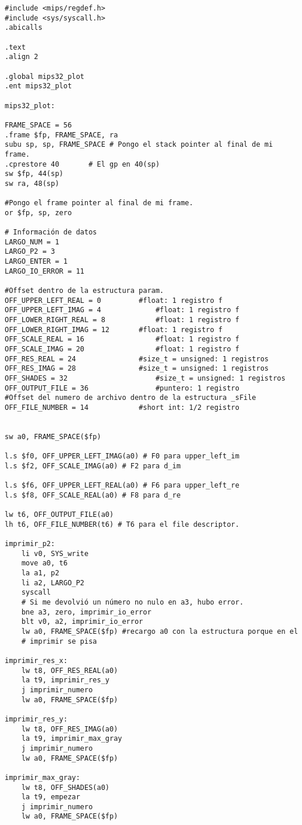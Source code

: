 \documentclass[a4paper,10pt]{article}
\begin{document}
\begin{verbatim}
#include <mips/regdef.h>
#include <sys/syscall.h>
.abicalls

.text
.align 2

.global mips32_plot
.ent mips32_plot

mips32_plot:

FRAME_SPACE = 56
.frame $fp, FRAME_SPACE, ra
subu sp, sp, FRAME_SPACE # Pongo el stack pointer al final de mi frame.
.cprestore 40		# El gp en 40(sp)
sw $fp, 44(sp)
sw ra, 48(sp)

#Pongo el frame pointer al final de mi frame.
or $fp, sp, zero

# Información de datos
LARGO_NUM = 1
LARGO_P2 = 3
LARGO_ENTER = 1
LARGO_IO_ERROR = 11

#Offset dentro de la estructura param.
OFF_UPPER_LEFT_REAL = 0			#float: 1 registro f
OFF_UPPER_LEFT_IMAG = 4 			#float: 1 registro f
OFF_LOWER_RIGHT_REAL = 8 			#float: 1 registro f
OFF_LOWER_RIGHT_IMAG = 12 		#float: 1 registro f
OFF_SCALE_REAL = 16 				#float: 1 registro f
OFF_SCALE_IMAG = 20 				#float: 1 registro f
OFF_RES_REAL = 24 				#size_t = unsigned: 1 registros
OFF_RES_IMAG = 28 				#size_t = unsigned: 1 registros
OFF_SHADES = 32 					#size_t = unsigned: 1 registros
OFF_OUTPUT_FILE = 36 				#puntero: 1 registro
#Offset del numero de archivo dentro de la estructura _sFile
OFF_FILE_NUMBER = 14 			#short int: 1/2 registro


sw a0, FRAME_SPACE($fp)

l.s $f0, OFF_UPPER_LEFT_IMAG(a0) # F0 para upper_left_im
l.s $f2, OFF_SCALE_IMAG(a0) # F2 para d_im

l.s $f6, OFF_UPPER_LEFT_REAL(a0) # F6 para upper_left_re
l.s $f8, OFF_SCALE_REAL(a0) # F8 para d_re

lw t6, OFF_OUTPUT_FILE(a0)
lh t6, OFF_FILE_NUMBER(t6) # T6 para el file descriptor.

imprimir_p2:
	li v0, SYS_write
	move a0, t6
	la a1, p2
	li a2, LARGO_P2
	syscall
	# Si me devolvió un número no nulo en a3, hubo error.
	bne a3, zero, imprimir_io_error
  	blt v0, a2, imprimir_io_error
	lw a0, FRAME_SPACE($fp) #recargo a0 con la estructura porque en el 
	# imprimir se pisa

imprimir_res_x:
	lw t8, OFF_RES_REAL(a0)
	la t9, imprimir_res_y
	j imprimir_numero
	lw a0, FRAME_SPACE($fp)
	
imprimir_res_y:
	lw t8, OFF_RES_IMAG(a0)
	la t9, imprimir_max_gray
	j imprimir_numero
	lw a0, FRAME_SPACE($fp)
	
imprimir_max_gray:
	lw t8, OFF_SHADES(a0)
	la t9, empezar
	j imprimir_numero
	lw a0, FRAME_SPACE($fp)


\end{verbatim}
\end{document}
